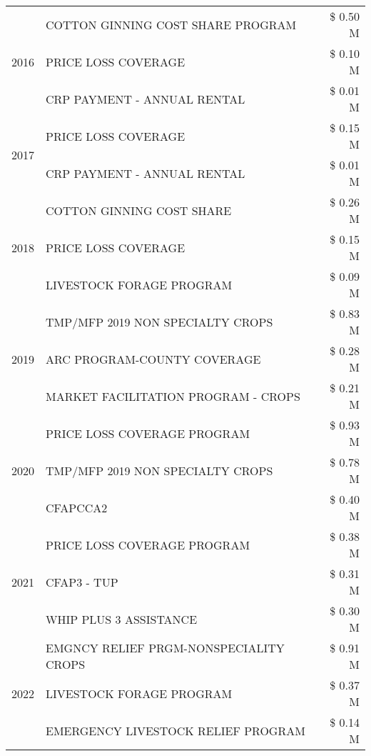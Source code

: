 \begin{tabular}{llr}
\cline{1-3}
\multirow[t]{3}{*}{2016} & COTTON GINNING COST SHARE PROGRAM & \$ 0.50 M \\
 & PRICE LOSS COVERAGE & \$ 0.10 M \\
 & CRP PAYMENT - ANNUAL RENTAL & \$ 0.01 M \\
\cline{1-3}
\multirow[t]{2}{*}{2017} & PRICE LOSS COVERAGE & \$ 0.15 M \\
 & CRP PAYMENT - ANNUAL RENTAL & \$ 0.01 M \\
\cline{1-3}
\multirow[t]{3}{*}{2018} & COTTON GINNING COST SHARE & \$ 0.26 M \\
 & PRICE LOSS COVERAGE & \$ 0.15 M \\
 & LIVESTOCK FORAGE PROGRAM & \$ 0.09 M \\
\cline{1-3}
\multirow[t]{3}{*}{2019} & TMP/MFP 2019 NON SPECIALTY CROPS & \$ 0.83 M \\
 & ARC PROGRAM-COUNTY COVERAGE & \$ 0.28 M \\
 & MARKET FACILITATION PROGRAM - CROPS & \$ 0.21 M \\
\cline{1-3}
\multirow[t]{3}{*}{2020} & PRICE LOSS COVERAGE PROGRAM & \$ 0.93 M \\
 & TMP/MFP 2019 NON SPECIALTY CROPS & \$ 0.78 M \\
 & CFAPCCA2 & \$ 0.40 M \\
\cline{1-3}
\multirow[t]{3}{*}{2021} & PRICE LOSS COVERAGE PROGRAM & \$ 0.38 M \\
 & CFAP3 - TUP & \$ 0.31 M \\
 & WHIP PLUS 3 ASSISTANCE & \$ 0.30 M \\
\cline{1-3}
\multirow[t]{3}{*}{2022} & EMGNCY RELIEF PRGM-NONSPECIALITY CROPS & \$ 0.91 M \\
 & LIVESTOCK FORAGE PROGRAM & \$ 0.37 M \\
 & EMERGENCY LIVESTOCK RELIEF PROGRAM & \$ 0.14 M \\
\cline{1-3}
\bottomrule
\end{tabular}
